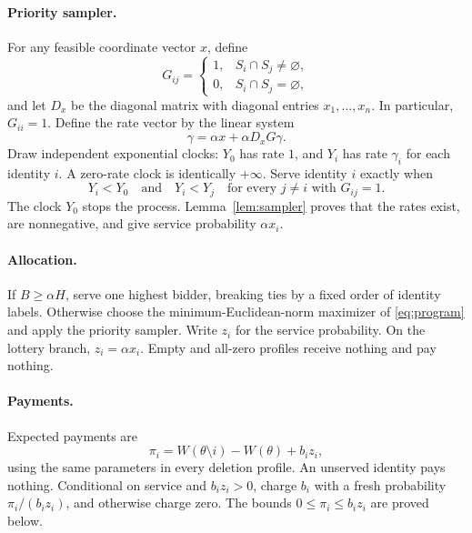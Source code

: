 \documentclass[11pt]{article}
\begin{document}
\paragraph{Priority sampler.}
For any feasible coordinate vector $x$, define
\[
G_{ij}=
\begin{cases}
1,& S_i\cap S_j\ne\varnothing,\\
0,& S_i\cap S_j=\varnothing,
\end{cases}
\]
and let $D_x$ be the diagonal matrix with diagonal entries
$x_1,\ldots,x_n$. In particular, $G_{ii}=1$.
Define the rate vector by the linear system
\begin{equation}
\label{eq:rates}
\gamma=\alpha x+\alpha D_xG\gamma.
\end{equation}
Draw independent exponential clocks: $Y_0$ has rate $1$, and
$Y_i$ has rate $\gamma_i$ for each identity $i$.
A zero-rate clock is identically $+\infty$.
Serve identity $i$ exactly when
\begin{equation}
\label{eq:priority-rule}
Y_i<Y_0
\quad\text{and}\quad
Y_i<Y_j
\quad\text{for every }j\ne i\text{ with }G_{ij}=1.
\end{equation}
The clock $Y_0$ stops the process.
Lemma~\ref{lem:sampler} proves that the rates exist, are
nonnegative, and give service probability $\alpha x_i$.

\paragraph{Allocation.}
If $B\ge\alpha H$, serve one highest bidder, breaking ties by a
fixed order of identity labels.
Otherwise choose the minimum-Euclidean-norm maximizer of
\eqref{eq:program} and apply the priority sampler.
Write $z_i$ for the service probability.
On the lottery branch, $z_i=\alpha x_i$.
Empty and all-zero profiles receive nothing and pay nothing.

\paragraph{Payments.}
Expected payments are
\begin{equation}
\label{eq:payments}
\pi_i=W(\theta\setminus i)-W(\theta)+b_i z_i,
\end{equation}
using the same parameters in every deletion profile.
An unserved identity pays nothing.
Conditional on service and $b_i z_i>0$, charge $b_i$ with a fresh
probability $\pi_i/(b_i z_i)$, and otherwise charge zero.
The bounds $0\le\pi_i\le b_i z_i$ are proved below.
\end{document}
